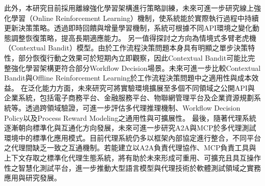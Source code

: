\begin{ZhChapter}
\text 此外，本研究目前採用離線強化學習架構進行策略訓練，未來可進一步研究線上強化學習（Online Reinforcement Learning）機制，使系統能於實際執行過程中持續更新決策策略。透過即時回饋與增量學習機制，系統可根據不同API環境之變化動態調整恢復策略，提高長期適應能力。
\text 另一值得探討之方向為情境式多臂老虎機（Contextual Bandit）模型。由於工作流程決策問題本身具有明顯之單步決策特性，部分恢復行動之效果可於短期內立即觀察，因此Contextual Bandit可能比完整強化學習架構更符合部分Workflow Decision場景。未來可進一步比較Contextual Bandit與Offline Reinforcement Learning於工作流程決策問題中之適用性與成本效益。
\text 在泛化能力方面，未來研究可將實驗環境擴展至多個不同領域之公開API與企業系統，包括電子商務平台、金融服務平台、物聯網管理平台及企業資源規劃系統等。透過跨領域驗證，可進一步評估多代理推理機制、Workflow Decision Policy以及Process Reward Modeling之通用性與可擴展性。
\text 最後，隨著代理系統逐漸朝向標準化與互通化方向發展，未來可進一步研究A2A與MCP於多代理測試環境中的標準化應用模式。目前代理系統仍多以框架內部協定進行整合，不同平台之代理間缺乏一致之互通機制。若能建立以A2A負責代理協作、MCP負責工具與上下文存取之標準化代理生態系統，將有助於未來形成可重用、可擴充且具互操作性之智慧化測試平台，進一步推動大型語言模型與代理技術於軟體測試領域之實務應用與研究發展。

\end{ZhChapter}
